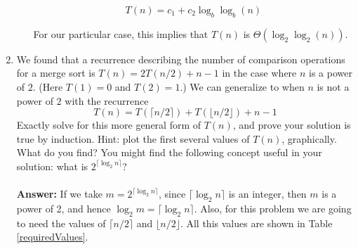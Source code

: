\documentclass[12pt]{scrartcl}
\begin{document}
\begin{enumerate}
\begin{enumerate}
			\begin{equation}\label{generalRecurrenceSolution}
				T(n) = c_1 + c_2 \log_b \log_b(n) 
			\end{equation}
			
			For our particular case, this implies that $T(n)$ is $\Theta(\log_2 \log_2(n))$.
			
		\end{enumerate}
	\item We found that a recurrence describing the number of comparison operations for a merge sort is $T(n) = 2T(n/2) + n - 1$ in the case where $n$ is a power of $2$. (Here $T(1) = 0$ and $T(2) = 1$.) We can generalize to when $n$ is not a power of $2$ with the recurrence 
	\begin{equation}
		T(n) = T(\lceil n / 2 \rceil) + T(\lfloor n / 2 \rfloor) + n - 1
	\end{equation}
	Exactly solve for this more general form of $T(n)$, and prove your solution is true by induction. Hint: plot the first several values of $T(n)$, graphically. What do you find? You might find the following concept useful in your solution: what is $2^{\lceil \log_2 n\rceil}$?\\
	\\
	\textbf{Answer: } If we take $m = 2^{\lceil \log_2 n\rceil}$, since ${\lceil \log_2 n\rceil}$ is an integer, then $m$ is a power of 2, and hence $\log_2m = \lceil \log_2 n\rceil$. Also, for this problem we are going to need the values of $\lceil n / 2 \rceil$ and $\lfloor n / 2 \rfloor$. All this values are shown in Table \ref{requiredValues}.
	

\end{enumerate}
\end{document}
